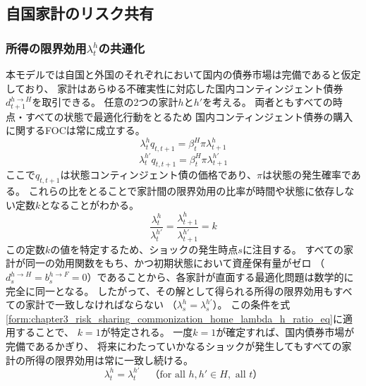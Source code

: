 
\subsection{自国家計のリスク共有}
\label{sec:chapter3_risk_sharing_commonization_home}

\subsubsection{所得の限界効用\(\lambda_t^h\)の共通化}
\label{sec:chapter3_risk_sharing_commonization_home_lambda_h}
本モデルでは自国と外国のそれぞれにおいて国内の債券市場は完備であると仮定しており、
家計はあらゆる不確実性に対応した国内コンティンジェント債券\(d_{t+1}^{h\to H}\)を取引できる。
任意の2つの家計\(h\)と\(h'\)を考える。
両者ともすべての時点・すべての状態で最適化行動をとるため
国内コンティンジェント債券の購入に関するFOCは常に成立する。
\begin{equation}
\label{form:chapter3_risk_sharing_commonization_home_lambda_h_eq}
    \lambda_t^hq_{t,t+1}=\beta_t^H\pi\lambda_{t+1}^h
\end{equation}
\begin{equation}
\label{form:chapter3_risk_sharing_commonization_home_lambda_h2_eq}
    \lambda_t^{h'}q_{t,t+1}=\beta_t^H\pi\lambda_{t+1}^{h'}
\end{equation}
ここで\(q_{t,t+1}\)は状態コンティンジェント債の価格であり、\(\pi\)は状態の発生確率である。
これらの比をとることで家計間の限界効用の比率が時間や状態に依存しない定数\(k\)となることがわかる。
\begin{equation}
\label{form:chapter3_risk_sharing_commonization_home_lambda_h_ratio_eq}
    \frac{\lambda_t^h}{\lambda_t^{h'}}=\frac{\lambda_{t+1}^h}{\lambda_{t+1}^{h'}}=k
\end{equation}
この定数\(k\)の値を特定するため、ショックの発生時点\(s\)に注目する。
すべての家計が同一の効用関数をもち、かつ初期状態において資産保有量がゼロ
（\(d_s^{h\to H}=b_s^{h\to F}=0\)）であることから、各家計が直面する最適化問題は数学的に完全に同一となる。
したがって、その解として得られる所得の限界効用もすべての家計で一致しなければならない
（\(\lambda_s^h=\lambda_s^{h'}\)）。
この条件を式\eqref{form:chapter3_risk_sharing_commonization_home_lambda_h_ratio_eq}に適用することで、
\(k=1\)が特定される。
一度\(k=1\)が確定すれば、国内債券市場が完備であるかぎり、
将来にわたっていかなるショックが発生してもすべての家計の所得の限界効用は常に一致し続ける。
\begin{equation}
\label{form:chapter3_risk_sharing_commonization_home_lambda_h_equality_eq}
    \lambda_t^h=\lambda_t^{h'}\quad（\text{for all }h,h'\in H,\text{ all }t）
\end{equation}

